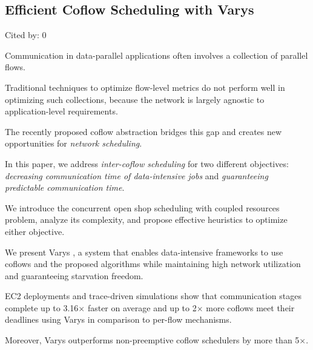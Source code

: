 \documentclass[a4paper,11pt]{article}
\begin{document}
\subsection*{Efficient Coflow Scheduling with Varys}
{\color{cyan} {\color{magenta} Cited by: 0}

Communication in 
data-parallel applications often involves a collection of 
parallel flows. 

Traditional techniques to 
optimize flow-level metrics 
do not perform well in optimizing such collections,
because the network is largely agnostic to application-level requirements.

The recently proposed coflow abstraction 
bridges this gap and 
creates new opportunities for 
{\color{red} \em network scheduling}. 

In this paper,
we address 
{\color{red} \em inter-coflow scheduling}
for two different objectives:
{\color{red} \em decreasing communication time of data-intensive jobs} and
{\color{red} \em guaranteeing predictable communication time}. 

We introduce the
{\color{red} concurrent open shop scheduling with coupled resources} 
problem,
analyze its complexity, and 
propose effective heuristics to optimize either objective. 

We present 
{\color{black} Varys \cite{varys}}, 
a system that 
enables data-intensive frameworks to use coflows and the proposed algorithms
while 
{\color{red} maintaining high network utilization} and 
{\color{red} guaranteeing starvation freedom}. 

EC2 deployments and trace-driven simulations
show that 
communication stages complete up to 3.16$\times$ faster on average and 
up to 2$\times$ more coflows meet their deadlines 
using Varys in comparison to per-flow mechanisms. 

Moreover, 
Varys outperforms non-preemptive coflow schedulers by more than 5$\times$.	

}
\end{document}
